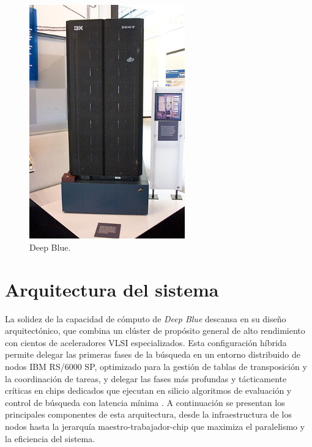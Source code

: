 \documentclass[a4paper, 12pt]{article}
\begin{document}
\begin{figure}[h]
    \centering
    \includegraphics[width=0.6\textwidth]{assets/deepblue.jpg}
    \caption{Deep Blue.}
    \label{fig:deepblue}
\end{figure}










\section{Arquitectura del sistema}

La solidez de la capacidad de cómputo de \textit{Deep Blue} 
descansa en su diseño arquitectónico, que combina un clúster de 
propósito general de alto rendimiento con cientos de 
aceleradores VLSI especializados. Esta configuración híbrida 
permite delegar las primeras fases de la búsqueda en un entorno 
distribuido de nodos IBM RS/6000 SP, optimizado para la gestión 
de tablas de transposición y la coordinación de tareas, y 
delegar las fases más profundas y tácticamente críticas en chips 
dedicados que ejecutan en silicio algoritmos de evaluación y 
control de búsqueda con latencia mínima \cite{campbell2002deep}. 
A continuación se presentan los principales componentes de esta 
arquitectura, desde la infraestructura de los nodos hasta la 
jerarquía maestro-trabajador-chip que maximiza el paralelismo y 
la eficiencia del sistema.
\end{document}
